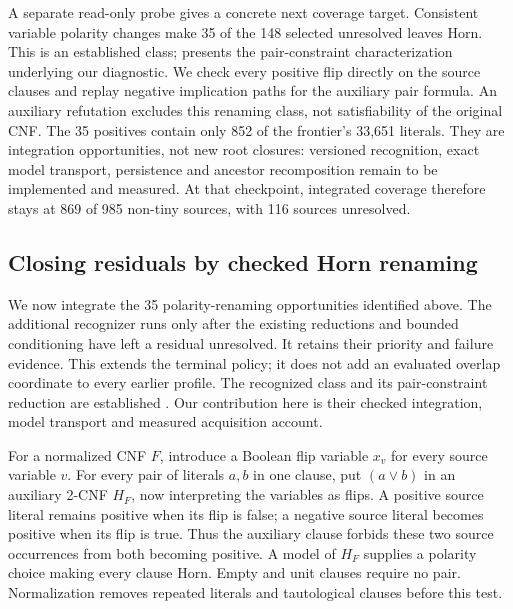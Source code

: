 \documentclass[11pt,a4paper]{article}
\numberwithin{equation}{section}
\theoremstyle{plain}
\theoremstyle{definition}
\theoremstyle{remark}
\begin{document}
A separate read-only probe gives a concrete next coverage target. Consistent variable polarity changes make 35 of the 148 selected unresolved leaves Horn. This is an established class; \citet{mannila1985renaming} presents the pair-constraint characterization underlying our diagnostic. We check every positive flip directly on the source clauses and replay negative implication paths for the auxiliary pair formula. An auxiliary refutation excludes this renaming class, not satisfiability of the original CNF. The 35 positives contain only 852 of the frontier's 33,651 literals. They are integration opportunities, not new root closures: versioned recognition, exact model transport, persistence and ancestor recomposition remain to be implemented and measured. At that checkpoint, integrated coverage therefore stays at 869 of 985 non-tiny sources, with 116 sources unresolved.

\subsection{Closing residuals by checked Horn renaming}
\label{sec:polarity-horn}

We now integrate the 35 polarity-renaming opportunities identified above. The additional recognizer runs only after the existing reductions and bounded conditioning have left a residual unresolved. It retains their priority and failure evidence. This extends the terminal policy; it does not add an evaluated overlap coordinate to every earlier profile. The recognized class and its pair-constraint reduction are established \citep{mannila1985renaming}. Our contribution here is their checked integration, model transport and measured acquisition account.

For a normalized CNF $F$, introduce a Boolean flip variable $x_v$ for every source variable $v$. For every pair of literals $a,b$ in one clause, put $(a\lor b)$ in an auxiliary 2-CNF $H_F$, now interpreting the variables as flips. A positive source literal remains positive when its flip is false; a negative source literal becomes positive when its flip is true. Thus the auxiliary clause forbids these two source occurrences from both becoming positive. A model of $H_F$ supplies a polarity choice making every clause Horn. Empty and unit clauses require no pair. Normalization removes repeated literals and tautological clauses before this test.
\end{document}
